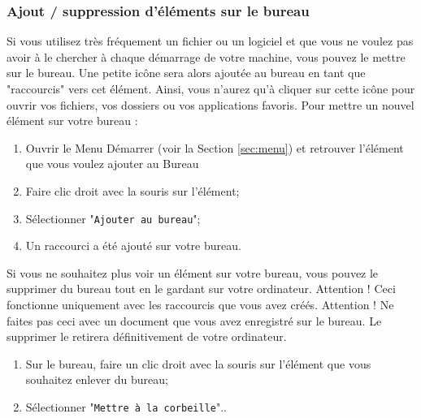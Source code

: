 \documentclass[12pt]{book}
\begin{document}
		\subsubsection{Ajout / suppression d'éléments sur le bureau}\label{sec:elementsbureau}
			Si vous utilisez très fréquement un fichier ou un logiciel et que vous ne voulez pas avoir à le chercher à chaque démarrage de votre machine, vous pouvez le mettre sur le bureau. 
			Une petite icône sera alors ajoutée au bureau en tant que "raccourcis" vers cet élément. 
			Ainsi, vous n'aurez qu'à cliquer sur cette icône pour ouvrir vos fichiers, vos dossiers ou vos applications favoris.\newline
			Pour mettre un nouvel élément sur votre bureau :
			\begin{enumerate}
				\item Ouvrir le Menu Démarrer (voir la Section \ref{sec:menu}) et retrouver l'élément que vous voulez ajouter au Bureau
				\item Faire clic droit avec la souris sur l'élément;
				\item Sélectionner "\texttt{Ajouter au bureau}";
				\item Un raccourci a été ajouté sur votre bureau.
			\end{enumerate}\par
			Si vous ne souhaitez plus voir un élément sur votre bureau, vous pouvez le supprimer du bureau tout en le gardant sur votre ordinateur.\newline
			Attention !
			Ceci fonctionne uniquement avec les raccourcis que vous avez créés. 
			Attention ! Ne faites pas ceci avec un document que vous avez enregistré sur le bureau.
			Le supprimer le retirera définitivement de votre ordinateur.
			\begin{enumerate}
				\item Sur le bureau, faire un clic droit avec la souris sur l'élément que vous souhaitez enlever du bureau;
				\item Sélectionner "\texttt{Mettre à la corbeille}"..
			\end{enumerate}
\end{document}
